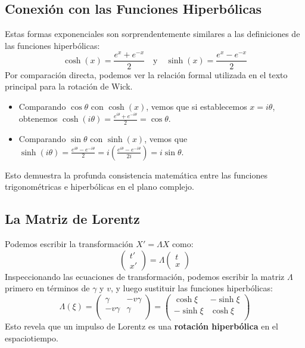 \documentclass[11pt,a4paper]{article}
\begin{document}
\subsection{Conexión con las Funciones Hiperbólicas}

Estas formas exponenciales son sorprendentemente similares a las definiciones de las funciones hiperbólicas:
\[ \cosh(x) = \frac{e^x + e^{-x}}{2} \quad \text{y} \quad \sinh(x) = \frac{e^x - e^{-x}}{2} \]
Por comparación directa, podemos ver la relación formal utilizada en el texto principal para la rotación de Wick.
\begin{itemize}
    \item Comparando $\cos\theta$ con $\cosh(x)$, vemos que si establecemos $x=i\theta$, obtenemos $\cosh(i\theta) = \frac{e^{i\theta} + e^{-i\theta}}{2} = \cos\theta$.
    \item Comparando $\sin\theta$ con $\sinh(x)$, vemos que $\sinh(i\theta) = \frac{e^{i\theta} - e^{-i\theta}}{2} = i \left( \frac{e^{i\theta} - e^{-i\theta}}{2i} \right) = i\sin\theta$.
\end{itemize}
Esto demuestra la profunda consistencia matemática entre las funciones trigonométricas e hiperbólicas en el plano complejo.

\subsection{La Matriz de Lorentz}
Podemos escribir la transformación $X' = \Lambda X$ como:
\[ \begin{pmatrix} t' \\ x'  \end{pmatrix} = \Lambda \begin{pmatrix} t \\ x  \end{pmatrix} \]
Inspeccionando las ecuaciones de transformación, podemos escribir la matriz $\Lambda$ primero en términos de $\gamma$ y $v$, y luego sustituir las funciones hiperbólicas:
\[
\Lambda(\xi) = \begin{pmatrix} \gamma & -v\gamma  \\ -v\gamma & \gamma  \\  \end{pmatrix}
=
\boxed{
\begin{pmatrix} \cosh\xi & -\sinh\xi  \\ -\sinh\xi & \cosh\xi  \\  \end{pmatrix}
}
\]
Esto revela que un impulso de Lorentz es una \textbf{rotación hiperbólica} en el espaciotiempo.
\end{document}
